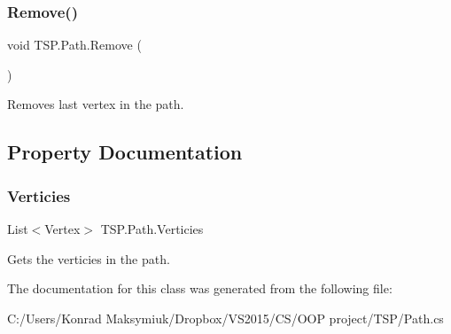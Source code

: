 \subsubsection{\texorpdfstring{Remove()}{Remove()}}
{\footnotesize\ttfamily void T\+S\+P.\+Path.\+Remove (\begin{DoxyParamCaption}{ }\end{DoxyParamCaption})\hspace{0.3cm}{\ttfamily [inline]}}



Removes last vertex in the path. 



\subsection{Property Documentation}
\mbox{\label{class_t_s_p_1_1_path_a38835275eabdb4069039af3c4e383ceb}} 
\subsubsection{\texorpdfstring{Verticies}{Verticies}}
{\footnotesize\ttfamily List$<$Vertex$>$ T\+S\+P.\+Path.\+Verticies\hspace{0.3cm}{\ttfamily [get]}}



Gets the verticies in the path. 



The documentation for this class was generated from the following file\+:\begin{DoxyCompactItemize}
\item 
C\+:/\+Users/\+Konrad Maksymiuk/\+Dropbox/\+V\+S2015/\+C\+S/\+O\+O\+P project/\+T\+S\+P/Path.\+cs\end{DoxyCompactItemize}
